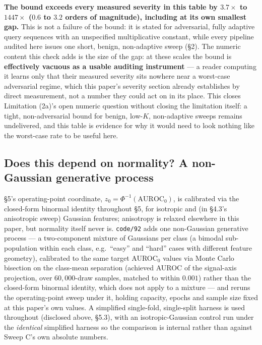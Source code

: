 \documentclass[10pt]{article} %
\begin{document}
\textbf{The bound exceeds every measured severity in this table by $3.7\times$
to $1447\times$ ($0.6$ to $3.2$ orders of magnitude), including at its own
smallest gap.} This is not a failure of the bound: it is stated for
adversarial, fully adaptive query sequences with an unspecified multiplicative
constant, while every pipeline audited here issues one short, benign,
non-adaptive sweep (§2). The numeric content this check adds is the size of
the gap: at these scales the bound is \textbf{effectively vacuous as a usable
auditing instrument} --- a reader computing it learns only that their measured
severity sits nowhere near a worst-case adversarial regime, which this paper's
severity section already establishes by direct measurement, not a number
they could act on in its place. This closes Limitation (2a)'s open numeric
question without closing the limitation itself: a tight, non-adversarial
bound for benign, low-$K$, non-adaptive sweeps remains undelivered, and this
table is evidence for why it would need to look nothing like the worst-case
rate to be useful here.

\subsection{Does this depend on normality? A non-Gaussian generative process}
\label{sec:nongaussian}

\S5's operating-point coordinate, $z_0=\Phi^{-1}(\text{AUROC}_0)$, is
calibrated via the closed-form binormal identity throughout \S5, for isotropic
and (in \S4.3's anisotropic sweep) Gaussian features; anisotropy is relaxed
elsewhere in this paper, but normality itself never is. \texttt{code/92} adds
one non-Gaussian generative process --- a two-component mixture of Gaussians
per class (a bimodal sub-population within each class, e.g.\ ``easy'' and
``hard'' cases with different feature geometry), calibrated to the same target
AUROC$_0$ values via Monte Carlo bisection on the class-mean separation
(achieved AUROC of the signal-axis projection, over $60{,}000$-draw samples,
matched to within $0.001$) rather than the closed-form binormal identity,
which does not apply to a mixture --- and reruns the operating-point sweep
under it, holding capacity, epochs and sample size fixed at this paper's own
values. A simplified single-fold, single-split harness is used throughout
(disclosed above, \S5.3), with an isotropic-Gaussian control run under the
\emph{identical} simplified harness so the comparison is internal rather than
against Sweep C's own absolute numbers.
\end{document}
